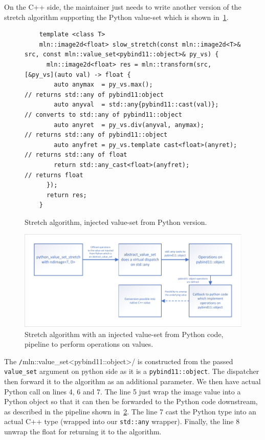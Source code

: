 On the C++ side, the maintainer just needs to write another version of the stretch algorithm supporting the Python
value-set which is shown in~\cref{fig:stretch.injected.python.code}.

\begin{figure}[htbp]
  \begin{verbatim}
    template <class T>
    mln::image2d<float> slow_stretch(const mln::image2d<T>& src, const mln::value_set<pybind11::object>& py_vs) {
      mln::image2d<float> res = mln::transform(src, [&py_vs](auto val) -> float {
        auto anymax  = py_vs.max();                        // returns std::any of pybind11:object
        auto anyval  = std::any{pybind11::cast(val)};      // converts to std::any of pybind11::object
        auto anyret  = py_vs.div(anyval, anymax);          // returns std::any of pybind11::object
        auto anyfret = py_vs.template cast<float>(anyret); // returns std::any of float
        return std::any_cast<float>(anyfret);              // returns float
      });
      return res;
    }
    \end{verbatim}
  \caption{Stretch algorithm, injected value-set from Python version.}
  \label{fig:stretch.injected.python.code}
\end{figure}

\begin{figure}[htbp]
  \centering
  \includegraphics[width=.8\linewidth]{../figures/static_dynamic_bridge/python_injected_value_set_stretch}
  \caption{Stretch algorithm with an injected value-set from Python code, pipeline to perform operations on values.}
  \label{fig:static_dyn.python_injected_value_set_stretch}
\end{figure}

The \texttt/mln::value_set<pybind11::object>/ is constructed from the passed \texttt{value\_set} argument on
python side as it is a \texttt{pybind11::object}. The dispatcher then forward it to the algorithm as an additional
parameter. We then have actual Python call on lines 4, 6 and 7. The line 5 just wrap the image value into a Python
object so that it can then be forwarded to the Python code downstream, as described in the pipeline shown
in~\cref{fig:static_dyn.python_injected_value_set_stretch}. The line 7 cast the Python type into an actual C++ type
(wrapped into our \texttt{std::any} wrapper). Finally, the line 8 unwrap the float for returning it to the algorithm.


